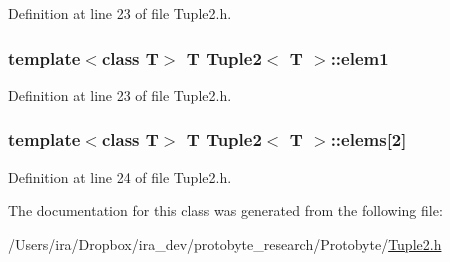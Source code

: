 Definition at line 23 of file Tuple2.\-h.

\hypertarget{class_tuple2_af54ac08b6fec1928d270c833aa954a25}{
\subsubsection[{elem1}]{\setlength{\rightskip}{0pt plus 5cm}template$<$class T$>$ T {\bf Tuple2}$<$ T $>$\-::elem1}}\label{class_tuple2_af54ac08b6fec1928d270c833aa954a25}


Definition at line 23 of file Tuple2.\-h.

\hypertarget{class_tuple2_a8b401e83aad88ad59bfb21f89329c2a0}{
\subsubsection[{elems}]{\setlength{\rightskip}{0pt plus 5cm}template$<$class T$>$ T {\bf Tuple2}$<$ T $>$\-::elems\mbox{[}2\mbox{]}}}\label{class_tuple2_a8b401e83aad88ad59bfb21f89329c2a0}


Definition at line 24 of file Tuple2.\-h.



The documentation for this class was generated from the following file\-:\begin{DoxyCompactItemize}
\item 
/\-Users/ira/\-Dropbox/ira\-\_\-dev/protobyte\-\_\-research/\-Protobyte/\hyperlink{_tuple2_8h}{Tuple2.\-h}\end{DoxyCompactItemize}
